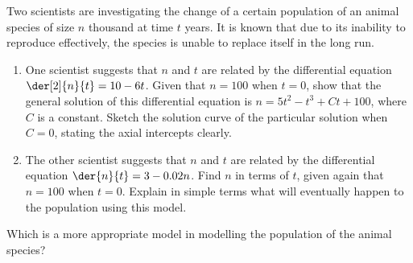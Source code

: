 \begin{problem}
    Two scientists are investigating the change of a certain population of an animal species of size $n$ thousand at time $t$ years. It is known that due to its inability to reproduce effectively, the species is unable to replace itself in the long run.
    \begin{enumerate}
        \item One scientist suggests that $n$ and $t$ are related by the differential equation $\der[2]{n}{t} = 10 - 6t$. Given that $n = 100$ when $t = 0$, show that the general solution of this differential equation is $n = 5t^2 - t^3 + Ct + 100$, where $C$ is a constant. Sketch the solution curve of the particular solution when $C = 0$, stating the axial intercepts clearly.
        \item The other scientist suggests that $n$ and $t$ are related by the differential equation $\der{n}{t} = 3 - 0.02n$. Find $n$ in terms of $t$, given again that $n = 100$ when $t = 0$. Explain in simple terms what will eventually happen to the population using this model.
    \end{enumerate}
    Which is a more appropriate model in modelling the population of the animal species?
\end{problem}
